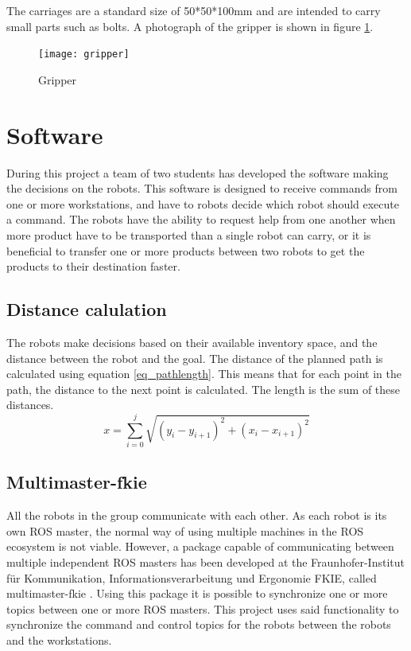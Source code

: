 \documentclass[10pt, journal]{IEEEtran}
\begin{document}
The carriages are a standard size of 50*50*100mm and are intended to carry small parts such as bolts. A photograph of the gripper is shown in figure \ref{Gripper}.
\begin{figure}[htp]
\centering
\texttt{[image: gripper]}
\caption{Gripper}
\label{Gripper}
\end{figure}

\section{Software}
During this project a team of two students has developed the software making the decisions on the robots. This software is designed to receive commands from one or more workstations, and have to robots decide which robot should execute a command. The robots have the ability to request help from one another when more product have to be transported than a single robot can carry, or it is beneficial to transfer one or more products between two robots to get the products to their destination faster.

\subsection{Distance calulation}
The robots make decisions based on their available inventory space, and the distance between the robot and the goal. The distance of the planned path is calculated using equation \ref{eq_pathlength}. This means that for each point in the path, the distance to the next point is calculated. The length is the sum of these distances.
\begin{equation}
\label{eq_pathlength}
x = \sum\limits_{i=0}^j \sqrt{(y_i - y_{i+1})^2 + (x_i - x_{i+1})^2}
\end{equation}

\subsection{Multimaster-fkie}
All the robots in the group communicate with each other. As each robot is its own ROS master, the normal\cite{ROSMultipleMachines} way of using multiple machines in the ROS ecosystem is not viable. However, a package capable of communicating between multiple independent ROS masters has been developed at the Fraunhofer-Institut für Kommunikation, Informationsverarbeitung und Ergonomie FKIE, called multimaster-fkie \cite{Multimaster-fkie}. Using this package it is possible to synchronize one or more topics between one or more ROS masters. This project uses said functionality to synchronize the command and control topics for the robots between the robots and the workstations.
\end{document}
